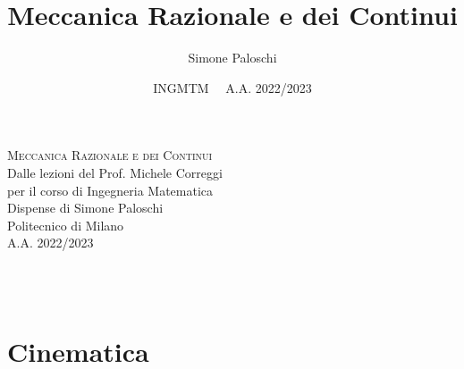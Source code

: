 \documentclass{article}
\title{Meccanica Razionale e dei Continui}
\author{Simone Paloschi}
\date{INGMTM \ \ A.A. 2022/2023}
\theoremstyle{unnumbered}
\theoremstyle{unnumbered1}
\begin{document}
\begin{center}
	\vspace*{1cm}
	{\Huge \textsc{Meccanica Razionale e dei Continui}}\\
	\vspace*{1cm}
	{\large {Dalle lezioni del Prof. Michele Correggi}}\\
	\vspace*{0.1cm}
	{\large per il corso di Ingegneria Matematica}\\
	\vspace*{0.7cm}
	{\large {Dispense di Simone Paloschi}}\\
	\vspace*{0.7cm}
	Politecnico di Milano\\
	A.A. 2022/2023
\end{center}
\phantom{}\\ \\

\begingroup
  \hypersetup{hidelinks}
  \tableofcontents
\endgroup


\pagebreak




\section{Cinematica}
\end{document}

